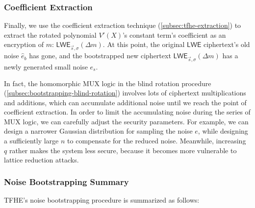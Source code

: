 \subsubsection{Coefficient Extraction}

Finally, we use the coefficient extraction technique (\autoref{subsec:tfhe-extraction}) to extract the rotated polynomial $V'(X)$'s constant term's coefficient as an encryption of $m$: $\textsf{LWE}_{\vec{s}, \sigma}(\Delta m)$. At this point, the original $\textsf{LWE}$ ciphertext's old noise $\hat{e}_b$ has gone, and the bootstrapped new ciphertext $\textsf{LWE}_{\vec{s}, \sigma}(\Delta m)$ has a newly generated small noise $e_s$. 

In fact, the homomorphic MUX logic in the blind rotation procedure (\autoref{subsec:bootstrapping-blind-rotation}) involves lots of ciphertext multiplications and additions, which can accumulate additional noise until we reach the point of coefficient extraction. In order to limit the accumulating noise during the series of MUX logic, we can carefully adjust the security parameters. For example, we can design a narrower Gaussian distribution for sampling the noise $e$, while designing a sufficiently large $n$ to compensate for the reduced noise. Meanwhile, increasing $q$ rather makes the system less secure, because it becomes more vulnerable to lattice reduction attacks. 






\subsubsection{Noise Bootstrapping Summary}
\label{subsec:tfhe-summary}

TFHE's noise bootstrapping procedure is summarized as follows:

